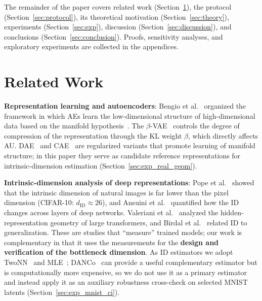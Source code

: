\documentclass[make,article,submit,pdftex,moreauthors]{Definitions/mdpi}
\newcommand{\dID}{d_{\mathrm{ID}}}
\begin{document}
The remainder of the paper covers related work (Section~\ref{sec:related}),
the protocol (Section~\ref{sec:protocol}), its theoretical motivation
(Section~\ref{sec:theory}), experiments (Section~\ref{sec:exp}), discussion
(Section~\ref{sec:discussion}), and conclusions
(Section~\ref{sec:conclusion}).
Proofs, sensitivity analyses, and exploratory experiments are collected in
the appendices.

\section{Related Work}\label{sec:related}

\textbf{Representation learning and autoencoders}:
Bengio et al.~\cite{bengio2013representation} organized the framework in
which AEs learn the low-dimensional structure of high-dimensional data based
on the manifold hypothesis~\cite{fefferman2016manifold}.
The $\beta$-VAE~\cite{higgins2017betavae} controls the degree of compression
of the representation through the KL weight $\beta$, which directly affects
AU.
DAE~\cite{alain2014dae} and CAE~\cite{rifai2011cae} are regularized variants
that promote learning of manifold structure; in this paper they serve as
candidate reference representations for intrinsic-dimension estimation
(Section~\ref{sec:exp_real_geom}).

\textbf{Intrinsic-dimension analysis of deep representations}:
Pope et al.~\cite{pope2021intrinsic} showed that the intrinsic dimension of
natural images is far lower than the pixel dimension (CIFAR-10:
$\dID \approx 26$), and Ansuini et al.~\cite{ansuini2019intrinsic}
quantified how the ID changes across layers of deep networks.
Valeriani et al.~\cite{valeriani2023geometry} analyzed the hidden-representation
geometry of large transformers, and Birdal et
al.~\cite{birdal2021intrinsic} related ID to generalization.
These are studies that ``measure'' trained models; our work is complementary
in that it uses the measurements for the \textbf{design and verification of
the bottleneck dimension}.
As ID estimators we adopt TwoNN~\cite{facco2017twonn} and
MLE~\cite{levina2005mle}; DANCo~\cite{ceruti2014danco} can provide a useful
complementary estimator but is computationally more expensive, so we do not
use it as a primary estimator and
instead apply it as an auxiliary robustness cross-check on selected MNIST
latents (Section~\ref{sec:exp_mnist_ci}).
\end{document}
